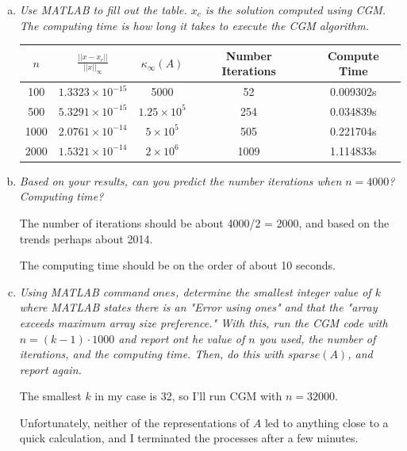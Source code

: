 \documentclass{article}
\begin{document}
\begin{enumerate}[(a)]
  \item \textit{Use MATLAB to fill out the table. $x_c$ is the solution computed using CGM. The computing time is how long it takes to execute the CGM algorithm.}

    \begin{table}[h!]
      \centering
      \begin{tabular} {c | c | c | c | c }
        $n$ & $\frac{||x-x_c||}{||x||_{\infty}}$ & $\kappa_{\infty}(A)$ & Number Iterations & Compute Time \\
        \hline
        100 & $1.3323\times 10^{-15}$ & 5000 & 52 & 0.009302s \\
        \hline
        500 & $5.3291\times 10^{-15}$ & $1.25\times 10^{5}$ & 254 & 0.034839s \\
        \hline
        1000 & $2.0761\times 10^{-14}$ & $5\times10^5$ & 505 & 0.221704s\\
        \hline
        2000 & $1.5321\times 10^{-14}$ & $2\times10^6$& 1009 & 1.114833s
      \end{tabular}
    \end{table}

  \item \textit{Based on your results, can you predict the number iterations when $n = 4000$? Computing time?}

    The number of iterations should be about 4000/2 = 2000, and based on the trends perhaps about 2014.

    The computing time should be on the order of about 10 seconds.
  \item \textit{Using MATLAB command $ones$, determine the smallest integer value of $k$ where MATLAB states there is an "Error using ones" and that the "array exceeds maximum array size preference." With this, run the CGM code with $n = (k-1)\cdot1000$ and report ont he value of $n$ you used, the number of iterations, and the computing time. Then, do this with $sparse(A)$, and report again.}

    
    The smallest $k$ in my case is 32, so I'll run CGM with $n = 32000$.

    Unfortunately, neither of the representations of $A$ led to anything close to a quick calculation, and I terminated the processes after a few minutes.
\end{enumerate}
\end{document}

